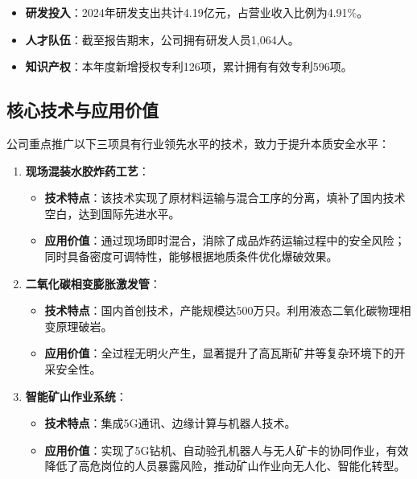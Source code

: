 \documentclass[a4paper,12pt]{article}
\begin{document}
\begin{itemize}
    \item \textbf{研发投入}：2024年研发支出共计4.19亿元，占营业收入比例为4.91\%。
    \item \textbf{人才队伍}：截至报告期末，公司拥有研发人员1,064人。
    \item \textbf{知识产权}：本年度新增授权专利126项，累计拥有有效专利596项。
\end{itemize}

\subsection{核心技术与应用价值}

公司重点推广以下三项具有行业领先水平的技术，致力于提升本质安全水平：

\begin{enumerate}
    \item \textbf{现场混装水胶炸药工艺}：
    \begin{itemize}
        \item \textbf{技术特点}：该技术实现了原材料运输与混合工序的分离，填补了国内技术空白，达到国际先进水平。
        \item \textbf{应用价值}：通过现场即时混合，消除了成品炸药运输过程中的安全风险；同时具备密度可调特性，能够根据地质条件优化爆破效果。
    \end{itemize}
    
    \item \textbf{二氧化碳相变膨胀激发管}：
    \begin{itemize}
        \item \textbf{技术特点}：国内首创技术，产能规模达500万只。利用液态二氧化碳物理相变原理破岩。
        \item \textbf{应用价值}：全过程无明火产生，显著提升了高瓦斯矿井等复杂环境下的开采安全性。
    \end{itemize}
    
    \item \textbf{智能矿山作业系统}：
    \begin{itemize}
        \item \textbf{技术特点}：集成5G通讯、边缘计算与机器人技术。
        \item \textbf{应用价值}：实现了5G钻机、自动验孔机器人与无人矿卡的协同作业，有效降低了高危岗位的人员暴露风险，推动矿山作业向无人化、智能化转型。
    \end{itemize}
\end{enumerate}

\end{document}
